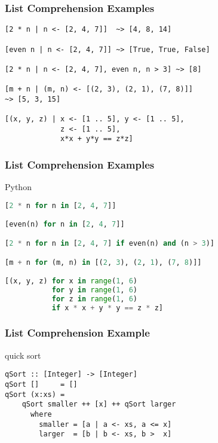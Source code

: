 \documentclass[dvipsnames]{beamer}
\theoremstyle{plain}
\begin{document}
\begin{frame}[fragile]
  \frametitle{List Comprehension Examples}

  \begin{exampleblock}{}
    \begin{lstlisting}
[2 * n | n <- [2, 4, 7]]  ~> [4, 8, 14]

[even n | n <- [2, 4, 7]] ~> [True, True, False]

[2 * n | n <- [2, 4, 7], even n, n > 3] ~> [8]

[m + n | (m, n) <- [(2, 3), (2, 1), (7, 8)]]
~> [5, 3, 15]

[(x, y, z) | x <- [1 .. 5], y <- [1 .. 5],
             z <- [1 .. 5],
             x*x + y*y == z*z]
    \end{lstlisting}
  \end{exampleblock}
\end{frame}

\begin{frame}[fragile]
  \frametitle{List Comprehension Examples}

  \begin{exampleblock}{Python}
    \begin{lstlisting}[language=Python]
[2 * n for n in [2, 4, 7]]

[even(n) for n in [2, 4, 7]]

[2 * n for n in [2, 4, 7] if even(n) and (n > 3)]

[m + n for (m, n) in [(2, 3), (2, 1), (7, 8)]]

[(x, y, z) for x in range(1, 6)
           for y in range(1, 6)
           for z in range(1, 6)
           if x * x + y * y == z * z]
    \end{lstlisting}
  \end{exampleblock}
\end{frame}

\begin{frame}[fragile]
  \frametitle{List Comprehension Example}

  \begin{exampleblock}{quick sort}
    \begin{lstlisting}
qSort :: [Integer] -> [Integer]
qSort []     = []
qSort (x:xs) =
    qSort smaller ++ [x] ++ qSort larger
      where
        smaller = [a | a <- xs, a <= x]
        larger  = [b | b <- xs, b >  x]
    \end{lstlisting}
  \end{exampleblock}
\end{frame}
\end{document}
